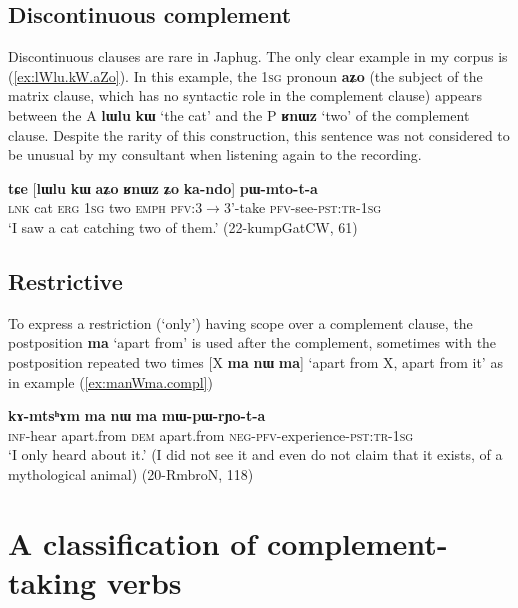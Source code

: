 \documentclass[oneside,a4paper,11pt]{article}
\newcommand{\ipa}[1]{\textbf{\phon#1}} %
\begin{document}
\subsection{Discontinuous complement} 

Discontinuous clauses are rare in Japhug. The only clear example in my corpus is (\ref{ex:lWlu.kW.aZo}). In this example, the \textsc{1sg} pronoun \ipa{aʑo} (the subject of the matrix clause, which has no syntactic role in the complement clause) appears between the A \ipa{lɯlu} 	\ipa{kɯ} `the cat' and the P \ipa{ʁnɯz} `two' of the complement clause. Despite the rarity of this construction, this sentence was not considered to be unusual by my consultant when listening again to the recording.
 
 \begin{exe}
\ex \label{ex:lWlu.kW.aZo}
\gll \ipa{tɕe} 	[\ipa{lɯlu} 	\ipa{kɯ} 	\ipa{aʑo} 	\ipa{ʁnɯz} 	\ipa{ʑo} 	\ipa{ka-ndo}] 	\ipa{pɯ-mto-t-a} \\
\textsc{lnk} cat \textsc{erg} \textsc{1sg} two \textsc{emph} \textsc{pfv}:3$\rightarrow$3'-take \textsc{pfv}-see-\textsc{pst:tr-1sg} \\
\glt `I saw a cat catching two of them.' (22-kumpGatCW, 61)
\end{exe}
 
\subsection{Restrictive} 
To express a restriction (`only') having scope over a complement clause, the postposition \ipa{ma} `apart from' is used after the complement, sometimes with the postposition repeated two times [X \ipa{ma} \ipa{nɯ} \ipa{ma}] `apart from X, apart from it' as in example (\ref{ex:manWma.compl})

\begin{exe}
\ex \label{ex:manWma.compl}
\gll \ipa{kɤ-mtsʰɤm} 	\ipa{ma} 	\ipa{nɯ} 	\ipa{ma} 	\ipa{mɯ-pɯ-rɲo-t-a} \\
\textsc{inf}-hear apart.from \textsc{dem} apart.from \textsc{neg-pfv}-experience-\textsc{pst:tr-1sg} \\
\glt `I only heard about it.' (I did not see it and even do not claim that it exists, of a mythological animal) (20-RmbroN, 118)
\end{exe}
 
  \section{A classification of complement-taking verbs} 
\end{document}
